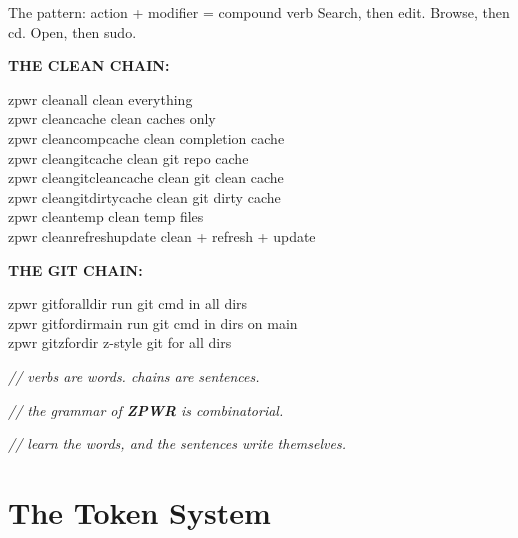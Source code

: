\documentclass[11pt,a4paper,twoside]{book}
\begin{document}
The pattern: action + modifier = compound verb Search, then edit. Browse, then cd. Open, then sudo.


\vspace{12pt}
{\bfseries\color{neonyellow} THE CLEAN CHAIN:}\vspace{4pt}

\begin{codebox}
\color{neongreen}zpwr cleanall             clean everything\\
\color{neongreen}zpwr cleancache           clean caches only\\
\color{neongreen}zpwr cleancompcache       clean completion cache\\
\color{neongreen}zpwr cleangitcache        clean git repo cache\\
\color{neongreen}zpwr cleangitcleancache   clean git clean cache\\
\color{neongreen}zpwr cleangitdirtycache   clean git dirty cache\\
\color{neongreen}zpwr cleantemp            clean temp files\\
\color{neongreen}zpwr cleanrefreshupdate   clean + refresh + update\\
\end{codebox}


\vspace{12pt}
{\bfseries\color{neonyellow} THE GIT CHAIN:}\vspace{4pt}

\begin{codebox}
\color{neongreen}zpwr gitforalldir     run git cmd in all dirs\\
\color{neongreen}zpwr gitfordirmain    run git cmd in dirs on main\\
\color{neongreen}zpwr gitzfordir       z-style git for all dirs\\
\end{codebox}

{\small\itshape\color{dimtext} // verbs are words. chains are sentences.}

{\small\itshape\color{dimtext} // the grammar of \textbf{ZPWR} is combinatorial.}

{\small\itshape\color{dimtext} // learn the words, and the sentences write themselves.}


\vspace{16pt}

\section{The Token System}
\end{document}
